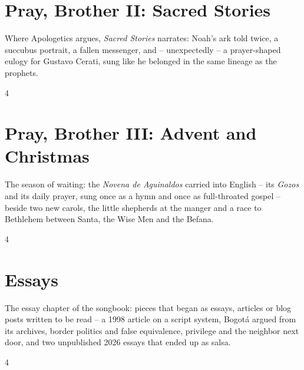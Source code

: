 \documentclass[a4paper,landscape]{memoir}
\begin{document}
\chapter{Pray, Brother II: Sacred Stories}
Where Apologetics argues, \emph{Sacred Stories} narrates: Noah's ark told twice, a succubus portrait, a fallen messenger, and -- unexpectedly -- a prayer-shaped eulogy for Gustavo Cerati, sung like he belonged in the same lineage as the prophets.
\clearpage\begin{multicols*}{4}









\end{multicols*}

\chapter{Pray, Brother III: Advent and Christmas}
The season of waiting: the \emph{Novena de Aguinaldos} carried into English -- its \emph{Gozos} and its daily prayer, sung once as a hymn and once as full-throated gospel -- %
beside two new carols, the little shepherds at the manger and a race to Bethlehem between Santa, the Wise Men and the Befana.
\clearpage\begin{multicols*}{4}










\end{multicols*}

\chapter{Essays}
The essay chapter of the songbook: pieces that began as essays, articles or blog posts written to be read -- a 1998 article on a script system, Bogotá argued from its archives, border politics and false equivalence, privilege and the neighbor next door, and two unpublished 2026 essays that ended up as salsa.
\clearpage\begin{multicols*}{4}














\end{multicols*}
\end{document}
